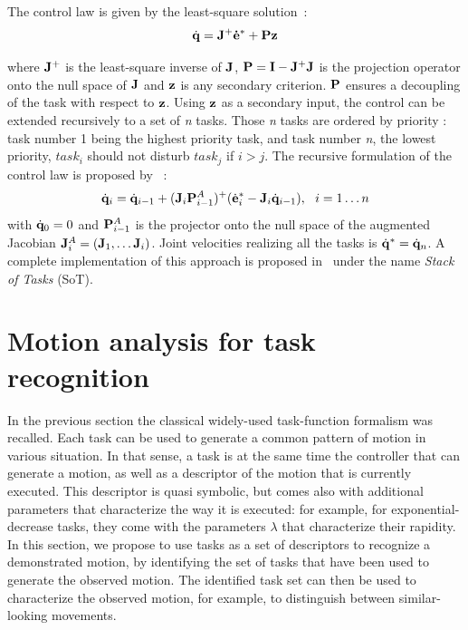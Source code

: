 \documentclass[letterpaper, 10pt, conference]{ieeeconf}      %
\begin{document}
The control law is given by the least-square solution~\cite{liegeois77}:
\begin{equation}
\dot{{\mathbf{q}}} = {\mathbf{J}}^+ {\mathbf{\dot{e}}}^* + {\mathbf{P}}{\mathbf{z}}
\label{eq:ltsq}
\end{equation}

\noindent where ${\mathbf{J}}^+$ is the least-square inverse of ${\mathbf{J}}$,
${\mathbf{P}} = {\mathbf{I}} - {\mathbf{J}}^+ {\mathbf{J}}$ is the projection operator onto the null space
of ${\mathbf{J}}$ and ${\mathbf{z}}$ is any secondary criterion. ${\mathbf{P}}$ ensures
a decoupling of the task with respect to ${\mathbf{z}}$. 
Using ${\mathbf{z}}$ as a secondary input, the control can be extended
recursively to a set of \emph{n} tasks. Those \emph{n} tasks
are ordered by priority : task number 1 being the highest priority task,
and task number \emph{n}, the lowest priority,
$task_i$ should not disturb $task_j$ if $i>j$.
The recursive formulation of the control law is proposed by~\cite{siciliano91} :
\begin{equation}
\dot{{\mathbf{q}}}_i = \dot{{\mathbf{q}}}_{i-1} + ({\mathbf{J}}_i {\mathbf{P}}_{i-1}^{A})^+
(\dot{{\mathbf{e}}}^*_i - {\mathbf{J}}_i \dot{{\mathbf{q}}}_{i-1}) , \ \ i = 1 \ldots n
\end{equation}
\noindent with $\dot{{\mathbf{q}}}_0 = 0$ and ${\mathbf{P}}_{i-1}^{A}$ is
the projector onto the null space of the augmented Jacobian
${\mathbf{J}}_i^A = ({\mathbf{J}}_1, \ldots {\mathbf{J}}_i)$. Joint velocities realizing all 
the tasks is $\dot{{\mathbf{q}}}^* = \dot{{\mathbf{q}}}_n$.
A complete implementation of this approach is proposed in~\cite{mansard07} under the
name \emph{Stack of Tasks} (SoT). 

\section{Motion analysis for task recognition} 
\label{sec:detect}
\label{section:algorithm}
In the previous section the classical widely-used task-function formalism was recalled.
Each task can be used to generate a common pattern of motion in various situation.
In that sense, a task is at the same time the controller that can
generate a motion, as well as a descriptor of the motion that is currently executed.
This descriptor is quasi symbolic, but comes also with additional parameters
that characterize the way it is executed: for example, for exponential-decrease tasks,
they come with the parameters $\lambda$ that characterize their rapidity. In this section,
we propose to use tasks as a set of descriptors to recognize a demonstrated motion,
by identifying the set of tasks that have been used to
generate the observed motion.
The identified task set can then be used to characterize the observed motion, for
example, to distinguish between similar-looking movements.
\end{document}
